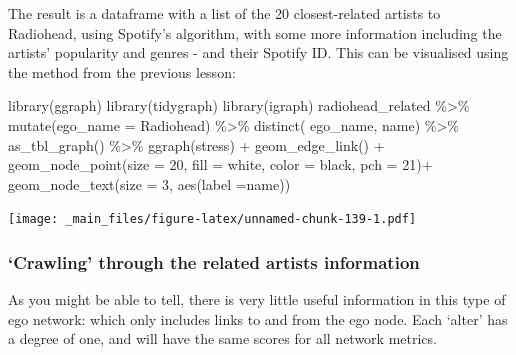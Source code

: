 \documentclass[
]{book}
\newenvironment{Shaded}{\begin{snugshade}}{\end{snugshade}}
\newcommand{\AttributeTok}[1]{\textcolor[rgb]{0.77,0.63,0.00}{#1}}
\newcommand{\DecValTok}[1]{\textcolor[rgb]{0.00,0.00,0.81}{#1}}
\newcommand{\FunctionTok}[1]{\textcolor[rgb]{0.00,0.00,0.00}{#1}}
\newcommand{\NormalTok}[1]{#1}
\newcommand{\SpecialCharTok}[1]{\textcolor[rgb]{0.00,0.00,0.00}{#1}}
\newcommand{\StringTok}[1]{\textcolor[rgb]{0.31,0.60,0.02}{#1}}
\begin{document}
The result is a dataframe with a list of the 20 closest-related artists to Radiohead, using Spotify's algorithm, with some more information including the artists' popularity and genres - and their Spotify ID. This can be visualised using the method from the previous lesson:

\begin{Shaded}
\begin{Highlighting}[]
\FunctionTok{library}\NormalTok{(ggraph)}
\FunctionTok{library}\NormalTok{(tidygraph)}
\FunctionTok{library}\NormalTok{(igraph)}
\NormalTok{radiohead\_related }\SpecialCharTok{\%\textgreater{}\%} 
  \FunctionTok{mutate}\NormalTok{(}\AttributeTok{ego\_name =} \StringTok{\textquotesingle{}Radiohead\textquotesingle{}}\NormalTok{) }\SpecialCharTok{\%\textgreater{}\%} 
  \FunctionTok{distinct}\NormalTok{( ego\_name, name) }\SpecialCharTok{\%\textgreater{}\%} 
  \FunctionTok{as\_tbl\_graph}\NormalTok{() }\SpecialCharTok{\%\textgreater{}\%} 
  \FunctionTok{ggraph}\NormalTok{(}\StringTok{\textquotesingle{}stress\textquotesingle{}}\NormalTok{) }\SpecialCharTok{+} \FunctionTok{geom\_edge\_link}\NormalTok{() }\SpecialCharTok{+} 
  \FunctionTok{geom\_node\_point}\NormalTok{(}\AttributeTok{size =} \DecValTok{20}\NormalTok{, }\AttributeTok{fill =} \StringTok{\textquotesingle{}white\textquotesingle{}}\NormalTok{, }\AttributeTok{color =} \StringTok{\textquotesingle{}black\textquotesingle{}}\NormalTok{, }\AttributeTok{pch =} \DecValTok{21}\NormalTok{)}\SpecialCharTok{+} 
  \FunctionTok{geom\_node\_text}\NormalTok{(}\AttributeTok{size =} \DecValTok{3}\NormalTok{, }\FunctionTok{aes}\NormalTok{(}\AttributeTok{label =}\NormalTok{name))}
\end{Highlighting}
\end{Shaded}

\texttt{[image: \_main\_files/figure-latex/unnamed-chunk-139-1.pdf]}

\hypertarget{crawling-through-the-related-artists-information}{%
\subsubsection{`Crawling' through the related artists information}\label{crawling-through-the-related-artists-information}}

As you might be able to tell, there is very little useful information in this type of ego network: which only includes links to and from the ego node. Each `alter' has a degree of one, and will have the same scores for all network metrics.
\end{document}

